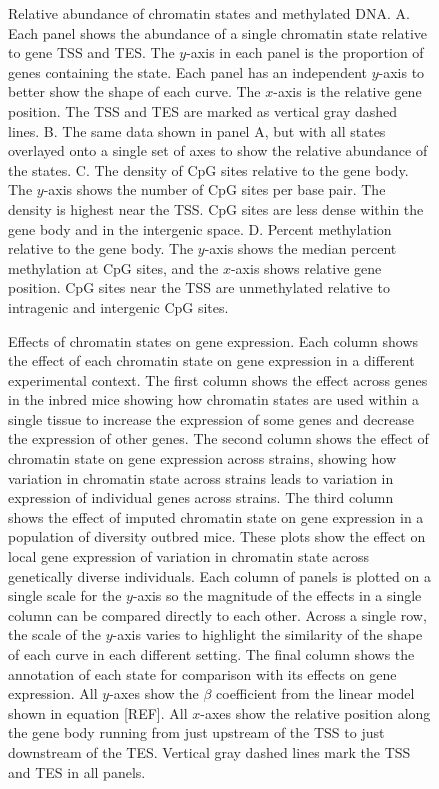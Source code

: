 \documentclass[10pt,letterpaper]{article}
\begin{document}
\begin{figure}[ht]
\centering
\caption{Relative abundance of chromatin states and methylated DNA. A. Each panel shows
the abundance of a single chromatin state relative to gene TSS and TES. The 
$y$-axis in each panel is the proportion of genes containing the state. Each
panel has an independent $y$-axis to better show the shape of each curve.
The $x$-axis is the relative gene position. The TSS and TES are marked as vertical
gray dashed lines. B. The same data shown in panel A, but with all states overlayed
onto a single set of axes to show the relative abundance of the states. 
C. The density of CpG sites relative to the gene body. The $y$-axis shows the 
number of CpG sites per base pair. The density is highest near the TSS. 
CpG sites are less dense within the gene body and in the intergenic space. 
D. Percent methylation relative to the gene body. The $y$-axis shows the median 
percent methylation at CpG sites, and the $x$-axis shows relative gene position. 
CpG sites near the TSS are unmethylated relative to intragenic and intergenic
CpG sites.}
\label{fig:state_abundance}
\end{figure}

\begin{figure}[ht]
\centering
\caption{Effects of chromatin states on gene expression. Each column shows 
the effect of each chromatin state on gene expression in a different 
experimental context. The first column shows the effect across genes in 
the inbred mice showing how chromatin states are used within a single 
tissue to increase the expression of some genes and decrease the expression 
of other genes. The second column shows the effect of chromatin state on 
gene expression across strains, showing how variation in chromatin state 
across strains leads to variation in expression of individual genes across 
strains. The third column shows the effect of imputed chromatin state on 
gene expression in a population of diversity outbred mice. These plots show 
the effect on local gene expression of variation in chromatin state across 
genetically diverse individuals. Each column of panels is plotted on a single 
scale for the $y$-axis so the magnitude of the effects in a single column can be 
compared directly to each other. Across a single row, the scale of the $y$-axis 
varies to highlight the similarity of the shape of each curve in each different 
setting. The final column shows the annotation of each state for comparison with
its effects on gene expression. All $y$-axes show the $\beta$ coefficient from 
the linear model shown in equation [REF]. All $x$-axes show the relative 
position along the gene body running from just upstream of the TSS to just downstream 
of the TES. Vertical gray dashed lines mark the TSS and TES in all panels.}
\label{fig:state_effects}
\end{figure}
\end{document}
